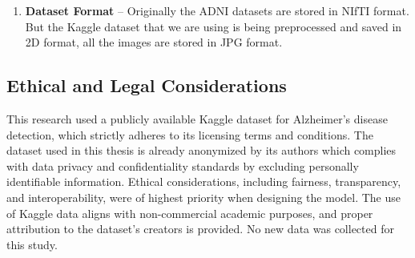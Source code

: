 \documentclass[12pt,onecolumn]{report}
\begin{document}
\begin{enumerate}
\begin{figure}[h!]
        \caption{Dataset Class distribution} %
        \label{fig:dataset_class_distribution} %
    \end{figure}
    – The figure \ref{fig:dataset_class_distribution} shows the class distribution in the dataset. As you can see in the figure \ref{fig:dataset_class_distribution} there 9600 images for Non Demented Class, and 8960 images for Mild Demented and Very Mild Demented Class and 6464 images for Moderately Demented Class. It is a moderately imbalanced dataset. But since we are going to check for accuracy scores for each classes we are not going to balance this dataset.
    \item \textbf{Dataset Format} – Originally the ADNI datasets are stored in NIfTI format. But the Kaggle dataset that we are using is being preprocessed and saved in 2D format, all the images are stored in JPG format.
\end{enumerate}

\subsection{Ethical and Legal Considerations}
This research used a publicly available Kaggle dataset for Alzheimer’s disease detection, which strictly adheres to its licensing terms and conditions. The dataset used in this thesis is already anonymized by its authors which complies with data privacy and confidentiality standards by excluding personally identifiable information. Ethical considerations, including fairness, transparency, and interoperability, were of highest priority when designing the model. The use of Kaggle data aligns with non-commercial academic purposes, and proper attribution to the dataset’s creators is provided. No new data was collected for this study.
\end{document}
